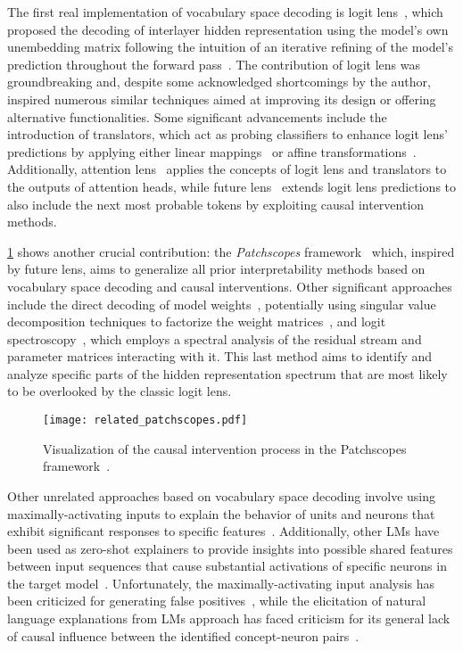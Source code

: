 The first real implementation of vocabulary space decoding is logit lens~\cite{nostalgebraist2020}, which proposed the decoding of interlayer hidden representation using the model's own unembedding matrix following the intuition of an iterative refining of the model's prediction throughout the forward pass~\cite{jastrzebski2018}.
The contribution of logit lens was groundbreaking and, despite some acknowledged shortcomings by the author, inspired numerous similar techniques aimed at improving its design or offering alternative functionalities.
Some significant advancements include the introduction of translators, which act as probing classifiers to enhance logit lens' predictions by applying either linear mappings~\cite{din2024} or affine transformations~\cite{belrose2023a}.
Additionally, attention lens~\cite{sakarvadia2023} applies the concepts of logit lens and translators to the outputs of attention heads, while future lens~\cite{pal2023} extends logit lens predictions to also include the next most probable tokens by exploiting causal intervention methods.

\cref{fig:related_patchscopes} shows another crucial contribution: the \emph{Patchscopes} framework~\cite{ghandeharioun2024} which, inspired by future lens, aims to generalize all prior interpretability methods based on vocabulary space decoding and causal interventions.
Other significant approaches include the direct decoding of model weights~\cite{dar2023}, potentially using singular value decomposition techniques to factorize the weight matrices~\cite{millidge2022}, and logit spectroscopy~\cite{cancedda2024}, which employs a spectral analysis of the residual stream and parameter matrices interacting with it.
This last method aims to identify and analyze specific parts of the hidden representation spectrum that are most likely to be overlooked by the classic logit lens.

\begin{figure}[t!]
    \centering
    \texttt{[image: related\_patchscopes.pdf]}
    \caption{Visualization of the causal intervention process in the Patchscopes framework~\cite{ghandeharioun2024}.}
    \label{fig:related_patchscopes}
\end{figure}

Other unrelated approaches based on vocabulary space decoding involve using maximally-activating inputs to explain the behavior of units and neurons that exhibit significant responses to specific features~\cite{dalvi2019}.
Additionally, other LMs have been used as zero-shot explainers to provide insights into possible shared features between input sequences that cause substantial activations of specific neurons in the target model~\cite{bills2023}.
Unfortunately, the maximally-activating input analysis has been criticized for generating false positives~\cite{bolukbasi2021}, while the elicitation of natural language explanations from LMs approach has faced criticism for its general lack of causal influence between the identified concept-neuron pairs~\cite{huang2023}.


